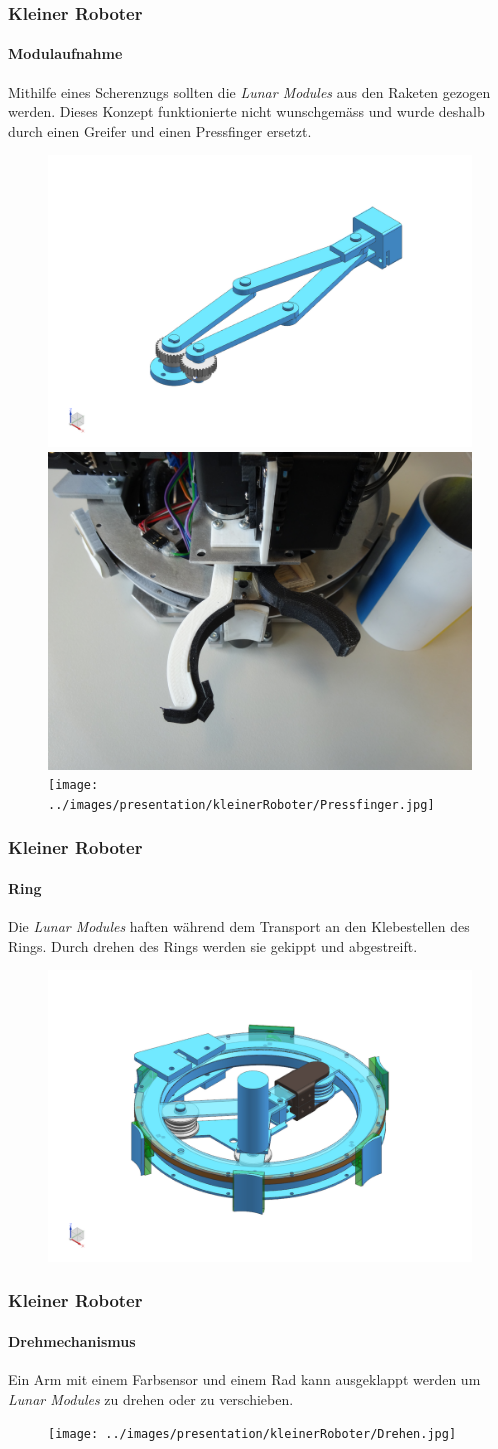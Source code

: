 \begin{frame}
	\frametitle{Kleiner Roboter}
	\framesubtitle{Modulaufnahme}
	Mithilfe eines Scherenzugs sollten die \textit{Lunar Modules} aus den Raketen gezogen werden.
	Dieses Konzept funktionierte nicht wunschgemäss und wurde deshalb durch einen Greifer und einen Pressfinger ersetzt.\\
	
	\begin{figure}
		\includegraphics[height = 3 cm]{../images/presentation/kleinerRoboter/Schere.png}
		\hspace{1em}
		\includegraphics[height = 3 cm]{../images/presentation/kleinerRoboter/Greifer.jpg}
		\hspace{2em}
		\texttt{[image: ../images/presentation/kleinerRoboter/Pressfinger.jpg]}
	\end{figure}
\end{frame}

\begin{frame}
	\frametitle{Kleiner Roboter}
	\framesubtitle{Ring}
	Die \textit{Lunar Modules} haften während dem Transport an den Klebestellen des Rings.
	Durch drehen des Rings werden sie gekippt und abgestreift.
	\begin{figure}
		\centering
		\includegraphics[height = 4 cm]{../images/presentation/kleinerRoboter/Ring.png}
	\end{figure}
\end{frame}

\begin{frame}
	\frametitle{Kleiner Roboter}
	\framesubtitle{Drehmechanismus}
	Ein Arm mit einem Farbsensor und einem Rad kann ausgeklappt werden um \textit{Lunar Modules} zu drehen oder zu verschieben.
	\begin{figure}
		\centering
		\texttt{[image: ../images/presentation/kleinerRoboter/Drehen.jpg]}
	\end{figure}
\end{frame}